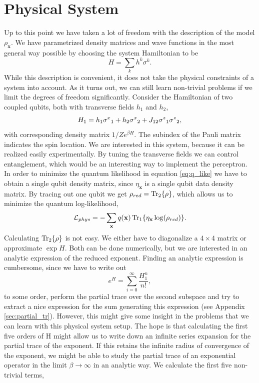 \section{Physical System}

Up to this point we have taken a lot of freedom with the description of the model $\rho_\mathbf{x}$. We have parametrized density matrices and wave functions in the most general way possible by choosing the system Hamiltonian to be
\begin{equation*}
    H = \sum_k h^k \sigma^k.
\end{equation*}
While this description is convenient, it does not take the physical constraints of a system into account. As it turns out, we can still learn non-trivial problems if we limit the degrees of freedom significantly. Consider the Hamiltonian of two coupled qubits, both with transverse fields $h_1$ and $h_2$,
\begin{equation*}
    H_1 = h_{1} {\sigma^{x}}_1 + h_{2} {\sigma^{x}}_2 + J_{12} {\sigma^{z}}_1 {\sigma^{z}}_2,
\end{equation*}
with corresponding density matrix $1/Z e^{\beta H}$. The subindex of the Pauli matrix indicates the spin location. We are interested in this system, because it can be realized easily experimentally. By tuning the transverse fields we can control entanglement, which would be an interesting way to implement the perceptron. In order to minimize the quantum likelihood in equation \ref{eq:q_like} we have to obtain a single qubit density matrix, since $\eta_\mathbf{x}$ is a single qubit data density matrix. By tracing out one qubit we get $\rho_{red} = \Tr_2\{\rho\}$, which allows us to minimize the quantum log-likelihood,
\begin{equation*}
    \mathcal{L}_{phys} = -\sum_{\mathbf{x}} q(\mathbf{x}) \Tr_1\{\eta_\mathbf{x}\log( \rho_{red})\}.
\end{equation*}
Calculating $\Tr_2\{\rho\}$ is not easy. We either have to diagonalize a $4\times4$ matrix or approximate $\exp{H}$. Both can be done numerically, but we are interested in an analytic expression of the reduced exponent. Finding an analytic expression is cumbersome, since we have to write out 
\begin{equation*}
    e^H = \sum_{i=0}^\infty \frac{H_1^n}{n!},
\end{equation*}
to some order, perform the partial trace over the second subspace and try to extract a nice expression for the sum generating this expression (see Appendix \ref{sec:partial_tr}). However, this might give some insight in the problems that we can learn with this physical system setup. The hope is that calculating the first five orders of H might allow us to write down an infinite series expansion for the partial trace of the exponent. If this retains the infinite radius of convergence of the exponent, we might be able to study the partial trace of an exponential operator in the limit $\beta\to \infty$ in an analytic way. We calculate the first five non-trivial terms,
